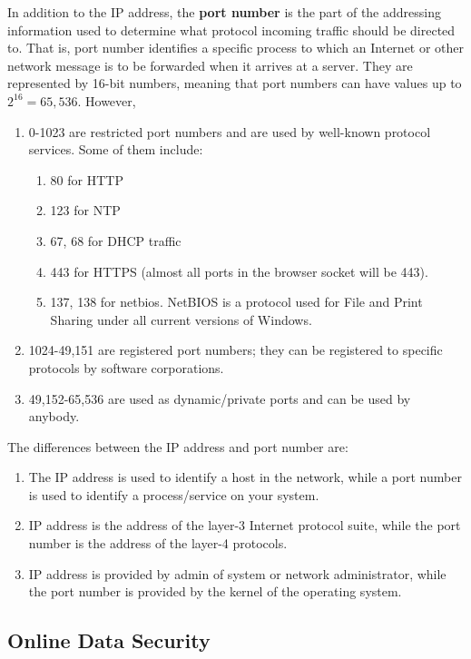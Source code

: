 \documentclass{article}
\begin{document}
  \begin{definition}
  In addition to the IP address, the \textbf{port number} is the part of the addressing information used to determine what protocol incoming traffic should be directed to. That is, port number identifies a specific process to which an Internet or other network message is to be forwarded when it arrives at a server. They are represented by 16-bit numbers, meaning that port numbers can have values up to $2^{16} = 65,536$. However,
  \begin{enumerate}
      \item 0-1023 are restricted port numbers and are used by well-known protocol services. Some of them include:
      \begin{enumerate}
          \item 80 for HTTP
          \item 123 for NTP
          \item 67, 68 for DHCP traffic
          \item 443 for HTTPS (almost all ports in the browser socket will be 443). 
          \item 137, 138 for netbios. NetBIOS is a protocol used for File and Print Sharing under all current versions of Windows. 
      \end{enumerate}
      \item 1024-49,151 are registered port numbers; they can be registered to specific protocols by software corporations.
      \item 49,152-65,536 are used as dynamic/private ports and can be used by anybody. 
  \end{enumerate}
  \end{definition}

  The differences between the IP address and port number are: 
  \begin{enumerate}
      \item The IP address is used to identify a host in the network, while a port number is used to identify a process/service on your system. 
      \item IP address is the address of the layer-3 Internet protocol suite, while the port number is the address of the layer-4 protocols. 
      \item IP address is provided by admin of system or network administrator, while the port number is provided by the kernel of the operating system. 
  \end{enumerate}


  \subsection{Online Data Security}
\end{document}
